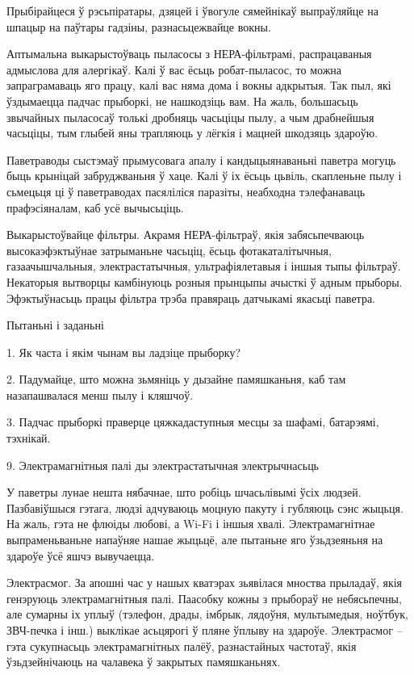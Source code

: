 Прыбірайцеся ў рэсьпіратары, дзяцей і ўвогуле сямейнікаў выпраўляйце на шпацыр на паўтары гадзіны, разнасьцежвайце вокны.

Аптымальна выкарыстоўваць пыласосы з НЕРА-фільтрамі, распрацаваныя адмыслова для алергікаў. Калі ў вас ёсьць робат-пыласос, то можна запраграмаваць яго працу, калі вас няма дома і вокны адкрытыя. Так пыл, які ўздымаецца падчас прыборкі, не нашкодзіць вам. На жаль, большасьць звычайных пыласосаў толькі дробняць часьціцы пылу, а чым драбнейшыя часьціцы, тым глыбей яны трапляюць у лёгкія і мацней шкодзяць здароўю.

Паветраводы сыстэмаў прымусовага апалу і кандыцыянаваньні паветра могуць быць крыніцай забруджваньня ў хаце. Калі ў іх ёсьць цьвіль, скапленьне пылу і сьмецьця ці ў паветраводах пасяліліся паразіты, неабходна тэлефанаваць прафэсіяналам, каб усё вычысьціць.

Выкарыстоўвайце фільтры. Акрамя НЕРА-фільтраў, якія забясьпечваюць высокаэфэктыўнае затрыманьне часьціц, ёсьць фотакаталітычныя, газаачышчальныя, электрастатычныя, ультрафіялетавыя і іншыя тыпы фільтраў. Некаторыя вытворцы камбінуюць розныя прынцыпы ачысткі ў адным прыборы. Эфэктыўнасьць працы фільтра трэба правяраць датчыкамі якасьці паветра.

Пытаньні і заданьні

1. Як часта і якім чынам вы ладзіце прыборку?

2. Падумайце, што можна зьмяніць у дызайне памяшканьня, каб там назапашвалася менш пылу і кляшчоў.

3. Падчас прыборкі праверце цяжкадаступныя месцы за шафамі, батарэямі, тэхнікай.


9. Электрамагнітныя палі ды электрастатычная электрычнасьць

У паветры лунае нешта нябачнае, што робіць шчасьлівымі ўсіх людзей. Пазбавіўшыся гэтага, людзі адчуваюць моцную пакуту і губляюць сэнс жыцьця. На жаль, гэта не флюіды любові, а Wi-Fi і іншыя хвалі. Электрамагнітнае выпраменьваньне напаўняе нашае жыцьцё, але пытаньне яго ўзьдзеяньня на здароўе ўсё яшчэ вывучаецца.

Электрасмог. За апошні час у нашых кватэрах зьявілася мноства прыладаў, якія генэруюць электрамагнітныя палі. Паасобку кожны з прыбораў не небясьпечны, але сумарны іх уплыў (тэлефон, драды, імбрык, лядоўня, мультымедыя, ноўтбук, ЗВЧ-печка і інш.) выклікае асьцярогі ў пляне ўплыву на здароўе. Электрасмог – гэта сукупнасьць электрамагнітных палёў, разнастайных частотаў, якія ўзьдзейнічаюць на чалавека ў закрытых памяшканьнях.

